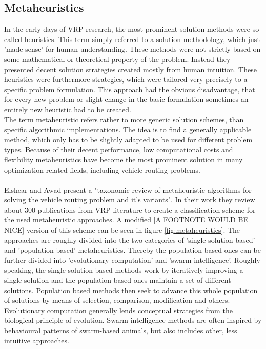 \subsection{Metaheuristics}\label{sec:metaheuristics}

In the early days of VRP research, the most prominent solution methods were so called heuristics. This term simply referred to a solution methodology, which just 'made sense' for human understanding. These methods were not strictly based on some mathematical or theoretical property of the problem. Instead they presented decent solution strategies created mostly from human intuition. These heuristics were furthermore strategies, which were tailored very precisely to a specific problem formulation. This approach had the obvious disadvantage, that for every new problem or slight change in the basic formulation sometimes an entirely new heuristic had to be created.\\
The term metaheuristic refers rather to more generic solution schemes, than specific algorithmic implementations. The idea is to find a generally applicable method, which only has to be slightly adapted to be used for different problem types. Because of their decent performance, low computational costs and flexibility metaheuristics have become the most prominent solution in many optimization related fields, including vehicle routing problems.\\ \\
Elshear and Awad \cite{elshaer_taxonomic_2020} present a "taxonomic review of metaheuristic algorithms for solving the vehicle routing problem and it's variants". In their work they review about 300 publications from VRP literature to create a classification scheme for the used metaheuristic approaches. A modified [A FOOTNOTE WOULD BE NICE] version of this scheme can be seen in figure \ref{fig:metaheuristics}. The approaches are roughly divided into the two categories of 'single solution based' and 'population based' metaheuristics. Thereby the population based ones can be further divided into 'evolutionary computation' and 'swarm intelligence'. Roughly speaking, the single solution based methods work by iteratively improving a single solution and the population based ones maintain a set of different solutions. Population based methods then seek to advance this whole population of solutions by means of selection, comparison, modification and others. Evolutionary computation generally lends conceptual strategies from the biological principle of evolution. Swarm intelligence methods are often inspired by behavioural patterns of swarm-based animals, but also includes other, less intuitive approaches.\\

